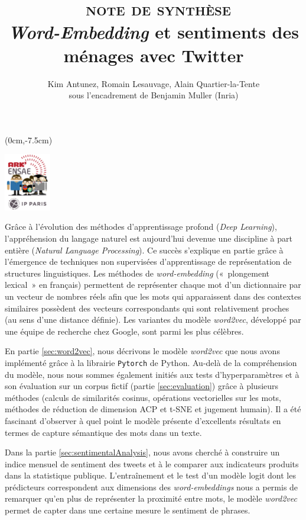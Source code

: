 \documentclass[10pt,french,french]{article}
\title{~\textsc{note de synthèse}\\
\hspace*{0.333em}\emph{Word-Embedding} et sentiments des ménages avec
Twitter}
\author{Kim Antunez, Romain Lesauvage, Alain Quartier-la-Tente\\
sous l'encadrement de Benjamin Muller (Inria)}
\date{}
\begin{document}
\maketitle


\begin{textblock*}{\textwidth}(0cm,-7.5cm)
\begin{center}
\includegraphics[height=2.5cm]{img/LOGO-ENSAE.png}
\end{center}
\end{textblock*}

Grâce à l'évolution des méthodes d'apprentissage profond (\emph{Deep
Learning}), l'appréhension du langage naturel est aujourd'hui devenue
une discipline à part entière (\emph{Natural Language Processing}). Ce
succès s'explique en partie grâce à l'émergence de techniques non
supervisées d'apprentissage de représentation de structures
linguistiques. Les méthodes de \emph{word-embedding} («~plongement
lexical~» en français) permettent de représenter chaque mot d'un
dictionnaire par un vecteur de nombres réels afin que les mots qui
apparaissent dans des contextes similaires possèdent des vecteurs
correspondants qui sont relativement proches (au sens d'une distance
définie). Les variantes du modèle \emph{word2vec}, développé par une
équipe de recherche chez Google, sont parmi les plus célèbres.

En partie \ref{sec:word2vec}, nous décrivons le modèle \emph{word2vec}
que nous avons implémenté grâce à la librairie \texttt{Pytorch} de
Python. Au-delà de la compréhension du modèle, nous nous sommes
également initiés aux tests d'hyperparamètres et à son évaluation sur un
corpus fictif (partie \ref{sec:evaluation}) grâce à plusieurs méthodes
(calculs de similarités cosinus, opérations vectorielles sur les mots,
méthodes de réduction de dimension ACP et t-SNE et jugement humain). Il
a été fascinant d'observer à quel point le modèle présente d'excellents
résultats en termes de capture sémantique des mots dans un texte.

Dans la partie \ref{sec:sentimentalAnalysis}, nous avons cherché à
construire un indice mensuel de sentiment des tweets et à le comparer
aux indicateurs produits dans la statistique publique. L'entraînement et
le test d'un modèle logit dont les prédicteurs correspondent aux
dimensions des \emph{word-embeddings} nous a permis de remarquer qu'en
plus de représenter la proximité entre mots, le modèle \emph{word2vec}
permet de capter dans une certaine mesure le sentiment de phrases.
\end{document}
